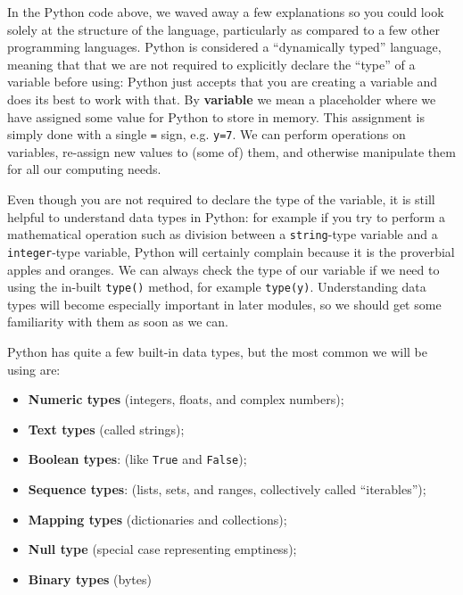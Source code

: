 \documentclass{tufte-book}
\begin{document}

In the Python code above, we waved away a few explanations so you could look solely at the structure of the language, particularly as compared to a few other programming languages. Python is considered a ``dynamically typed'' language, meaning that that we are not required to explicitly declare the ``type'' of a variable before using: Python just accepts that you are creating a variable and does its best to work with that. By \textbf{variable} we mean a placeholder where we have assigned some value for Python to store in memory. This assignment is simply done with a single \verb|=| sign, e.g. \verb|y=7|. We can perform operations on variables, re-assign new values to (some of) them, and otherwise manipulate them for all our computing needs.

Even though you are not required to declare the type of the variable, it is still helpful to understand data types in Python: for example if you try to perform a mathematical operation such as division between a \verb|string|-type variable and a \verb|integer|-type variable, Python will certainly complain because it is the proverbial apples and oranges. We can always check the type of our variable if we need to using the in-built \verb|type()| method, for example \verb|type(y)|. Understanding data types will become especially important in later modules, so we should get some familiarity with them as soon as we can.

Python has quite a few built-in data types, but the most common we will be using are:

\begin{itemize}
    \item 
        \textbf{Numeric types} (integers, floats, and complex numbers);
    \item 
        \textbf{Text types} (called strings);
    \item 
        \textbf{Boolean types}: (like \verb|True| and \verb|False|);
    \item 
        \textbf{Sequence types}: (lists, sets, and ranges, collectively called ``iterables'');
    \item 
        \textbf{Mapping types} (dictionaries and collections);
    \item
        \textbf{Null type} (special case representing emptiness);
    \item 
        \textbf{Binary types} (bytes)
\end{itemize}
\end{document}
